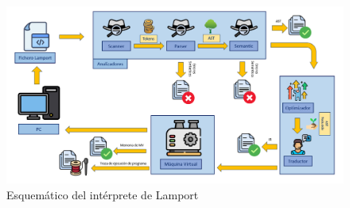 \begin{figure}[h]
    \includegraphics[width=\linewidth]{images/lmp/lmp_resume.png}
    \caption{Esquemático del intérprete de Lamport}
    \label{fig:lmpresume}
\end{figure}




